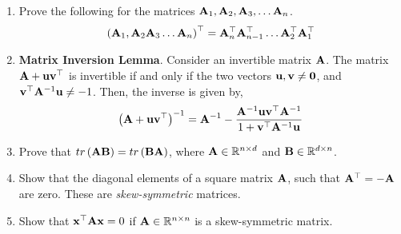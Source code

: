 \documentclass[
10pt, %
a4paper, %
oneside, %
headinclude,footinclude, %
BCOR5mm, %
]{scrartcl}
\def\mf{\ensuremath\mathbf}
\def\mb{\ensuremath\mathbb}
\def\lp{\ensuremath\left(}
\def\rp{\ensuremath\right)}
\begin{document}
\begin{enumerate}
	\item Prove the following for the matrices $\mf{A}_1, \mf{A}_2, \mf{A}_3, \ldots \mf{A}_n$.
	\[ \lp \mf{A}_1, \mf{A}_2 \mf{A}_3 \ldots \mf{A}_n \rp^\top =  \mf{A}_n^\top \mf{A}_{n-1}^\top \ldots \mf{A}_2^\top \mf{A}_1^\top \]


	\item \textbf{Matrix Inversion Lemma}. Consider an invertible matrix $\mf{A}$. The matrix $\mf{A} + \mf{u}\mf{v}^\top$ is invertible if and only if the two vectors $\mf{u}, \mf{v} \neq \mf{0}$, and $\mf{v}^\top\mf{A}^{-1}\mf{u} \neq -1$. Then, the inverse is given by,
	\[ \lp \mf{A} + \mf{u}\mf{v}^\top\rp^{-1} = \mf{A}^{-1} - \frac{\mf{A}^{-1}\mf{u}\mf{v}^\top\mf{A}^{-1}}{1 + \mf{v}^{\top}\mf{A}^{-1}\mf{u}} \]

	\item Prove that $tr\lp \mf{A}\mf{B} \rp = tr\lp \mf{B}\mf{A} \rp$, where $\mf{A} \in \mb{R}^{n \times d}$ and $\mf{B} \in \mb{R}^{d \times n}$.
	
	\item Show that the diagonal elements of a square matrix $\mf{A}$, such that $\mf{A}^\top = -\mf{A}$ are zero. These are \textit{skew-symmetric} matrices.
	
	\item Show that $\mf{x}^\top\mf{A}\mf{x} = 0$ if $\mf{A} \in \mb{R}^{n \times n}$ is a skew-symmetric matrix.

	



\end{enumerate}
\end{document}
